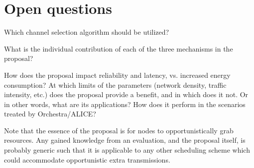 \documentclass[journal,comsoc]{IEEEtran}
\begin{document}


\section{Open questions}
Which channel selection algorithm should be utilized?

What is the individual contribution of each of the three mechanisms in the proposal?

How does the proposal impact reliability and latency, vs. increased energy consumption? At which limits of the parameters (network density, traffic intensity, etc.) does the proposal provide a benefit, and in which does it not. Or in other words, what are its applications? How does it perform in the scenarios treated by Orchestra/ALICE?

Note that the essence of the proposal is for nodes to opportunistically grab resources. Any gained knowledge from an evaluation, and the proposal itself, is probably generic such that it is applicable to any other scheduling scheme which could accommodate opportunistic extra transmissions.



%
%
\end{document}
